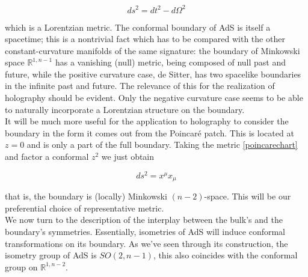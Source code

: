 \documentclass[11pt,a4paper,twoside,openright]{book}
\begin{document}
\begin{equation}
	ds^2 = dt^2 - d\Omega^2 
\end{equation}

which is a Lorentzian metric. The conformal boundary of AdS is itself a spacetime; this is a nontrivial fact which has to be compared with the other constant-curvature manifolds of the same signature: the boundary of Minkowski space $\mathbb{R}^{1,n-1}$ has a vanishing (null) metric, being composed of null past and future, while the positive curvature case, de Sitter, has two spacelike boundaries in the infinite past and future. The relevance of this for the realization of holography should be evident. Only the negative curvature case seems to be able to naturally incorporate a Lorentzian structure on the boundary.\\

It will be much more useful for the application to holography to consider the boundary in the form it comes out from the Poincaré patch. This is located at $z=0$ and is only a part of the full boundary. Taking the metric \ref{poincarechart} and factor a conformal $z^2$ we just obtain

\begin{equation}
	ds^2 = x^\mu x_\mu
\end{equation}

that is, the boundary is (locally) Minkowski $(n-2)$-space. This will be our preferential choice of representative metric.\\

We now turn to the description of the interplay between the bulk's and the boundary's symmetries. Essentially, isometries of AdS will induce conformal transformations on its boundary. As we've seen through its construction, the isometry group of AdS is $SO(2,n-1)$, this also coincides with the conformal group on $\mathbb{R}^{1,n-2}$.

\backmatter



\end{document}
